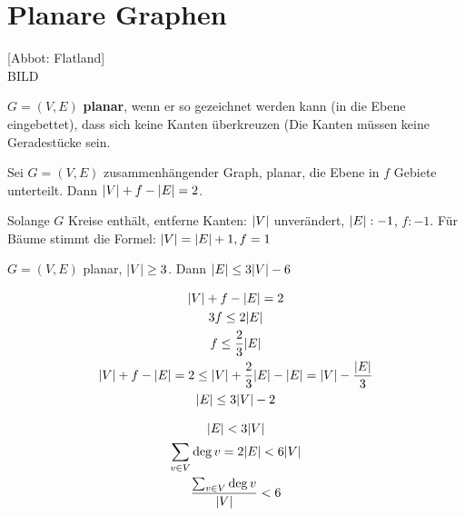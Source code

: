 \section{Planare Graphen}
[Abbot: Flatland]\\
BILD\\
\begin{def*}[note = planar , index = planar]
	$G=(V,E)$ \textbf{planar}, wenn er so gezeichnet werden kann (in die Ebene eingebettet), dass sich keine Kanten überkreuzen (Die Kanten müssen keine Geradestücke sein.
\end{def*}
\begin{satz*}[note = Eulersche Polyederformel , index = Eulersche Polyederformel]
	Sei $G=(V,E)$ zusammenhängender Graph, planar, die Ebene in $f$ Gebiete unterteilt. Dann $\abs{V} + f - \abs{E} = 2$.
	\begin{bew}
		Solange $G$ Kreise enthält, entferne Kanten: $\abs{V}$ unverändert, $\abs{E}: -1$, $f: -1$. Für Bäume stimmt die Formel: $\abs{V} = \abs{E} + 1, f = 1$
	\end{bew}
	\begin{korr*}
		$G=(V,E)$ planar, $\abs{V} \geq 3$. Dann $\abs{E} \leq 3 \abs{V} - 6$\\
		\begin{bew}
			\begin{gather*}
				\abs{V} + f - \abs{E} = 2 \\
				3f \leq 2 \abs{E} \\
				f \leq \frac{2}{3} \abs{E} \\
				\abs{V} + f - \abs{E} = 2 \leq \abs{V} + \frac{2}{3} \abs{E} - \abs{E} = \abs{V} - \frac{\abs{E}}{3} \\
				\abs{E} \leq 3 \abs{V} - 2
			\end{gather*}
		\end{bew}
	\end{korr*}
	\begin{gather*}
		\abs{E} < 3 \abs{V} \\
		\sum_{v \in V} \deg v = 2 \abs{E} < 6 \abs{V} \\
		\frac{\sum_{v \in V} \deg v}{\abs{V}} < 6
	\end{gather*}
\end{satz*}

